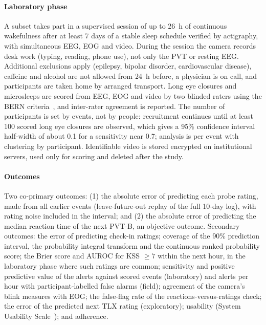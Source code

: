\paragraph*{Laboratory phase} A subset takes part in a supervised session of up to 26~h of continuous wakefulness after at least 7 days of a stable sleep schedule verified by actigraphy, with simultaneous EEG, EOG and video. During the session the camera records desk work (typing, reading, phone use), not only the PVT or resting EEG. Additional exclusions apply (epilepsy, bipolar disorder, cardiovascular disease), caffeine and alcohol are not allowed from 24~h before, a physician is on call, and participants are taken home by arranged transport. Long eye closures and microsleeps are scored from EEG, EOG and video by two blinded raters using the BERN criteria~\cite{hertig2020microsleep}, and inter-rater agreement is reported. The number of participants is set by events, not by people: recruitment continues until at least 100 scored long eye closures are observed, which gives a 95\% confidence interval half-width of about 0.1 for a sensitivity near 0.7; analysis is per event with clustering by participant. Identifiable video is stored encrypted on institutional servers, used only for scoring and deleted after the study.

\paragraph*{Outcomes} Two co-primary outcomes: (1) the absolute error of predicting each probe rating, made from all earlier events (leave-future-out replay of the full 10-day log), with rating noise included in the interval; and (2) the absolute error of predicting the median reaction time of the next PVT-B, an objective outcome. Secondary outcomes: the error of predicting check-in ratings; coverage of the 90\% prediction interval, the probability integral transform and the continuous ranked probability score; the Brier score and AUROC for KSS $\geq 7$ within the next hour, in the laboratory phase where such ratings are common; sensitivity and positive predictive value of the alerts against scored events (laboratory) and alerts per hour with participant-labelled false alarms (field); agreement of the camera's blink measures with EOG; the false-flag rate of the reactions-versus-ratings check; the error of the predicted next TLX rating (exploratory); usability (System Usability Scale~\cite{brooke1996sus}); and adherence.

